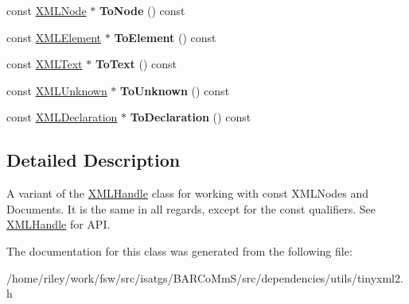 \begin{DoxyCompactItemize}
\item 
const \hyperlink{classtinyxml2_1_1_x_m_l_node}{X\+M\+L\+Node} $\ast$ {\bfseries To\+Node} () const \hypertarget{classtinyxml2_1_1_x_m_l_const_handle_a95d0256318c10c3f75fa5f8ffb3e4bc1}{}\label{classtinyxml2_1_1_x_m_l_const_handle_a95d0256318c10c3f75fa5f8ffb3e4bc1}

\item 
const \hyperlink{classtinyxml2_1_1_x_m_l_element}{X\+M\+L\+Element} $\ast$ {\bfseries To\+Element} () const \hypertarget{classtinyxml2_1_1_x_m_l_const_handle_a5a48adefc2a5e70d4ce5b55692a0e2f9}{}\label{classtinyxml2_1_1_x_m_l_const_handle_a5a48adefc2a5e70d4ce5b55692a0e2f9}

\item 
const \hyperlink{classtinyxml2_1_1_x_m_l_text}{X\+M\+L\+Text} $\ast$ {\bfseries To\+Text} () const \hypertarget{classtinyxml2_1_1_x_m_l_const_handle_ad86ca7dbb20d0495ae357fe7a866e0be}{}\label{classtinyxml2_1_1_x_m_l_const_handle_ad86ca7dbb20d0495ae357fe7a866e0be}

\item 
const \hyperlink{classtinyxml2_1_1_x_m_l_unknown}{X\+M\+L\+Unknown} $\ast$ {\bfseries To\+Unknown} () const \hypertarget{classtinyxml2_1_1_x_m_l_const_handle_acb358a329e54fa204ed2d0b181566828}{}\label{classtinyxml2_1_1_x_m_l_const_handle_acb358a329e54fa204ed2d0b181566828}

\item 
const \hyperlink{classtinyxml2_1_1_x_m_l_declaration}{X\+M\+L\+Declaration} $\ast$ {\bfseries To\+Declaration} () const \hypertarget{classtinyxml2_1_1_x_m_l_const_handle_a5de0c175845bc30a6f9b3d88d8877eaf}{}\label{classtinyxml2_1_1_x_m_l_const_handle_a5de0c175845bc30a6f9b3d88d8877eaf}

\end{DoxyCompactItemize}


\subsection{Detailed Description}
A variant of the \hyperlink{classtinyxml2_1_1_x_m_l_handle}{X\+M\+L\+Handle} class for working with const X\+M\+L\+Nodes and Documents. It is the same in all regards, except for the \textquotesingle{}const\textquotesingle{} qualifiers. See \hyperlink{classtinyxml2_1_1_x_m_l_handle}{X\+M\+L\+Handle} for A\+PI. 

The documentation for this class was generated from the following file\+:\begin{DoxyCompactItemize}
\item 
/home/riley/work/fsw/src/isatgs/\+B\+A\+R\+Co\+Mm\+S/src/dependencies/utils/tinyxml2.\+h\end{DoxyCompactItemize}
